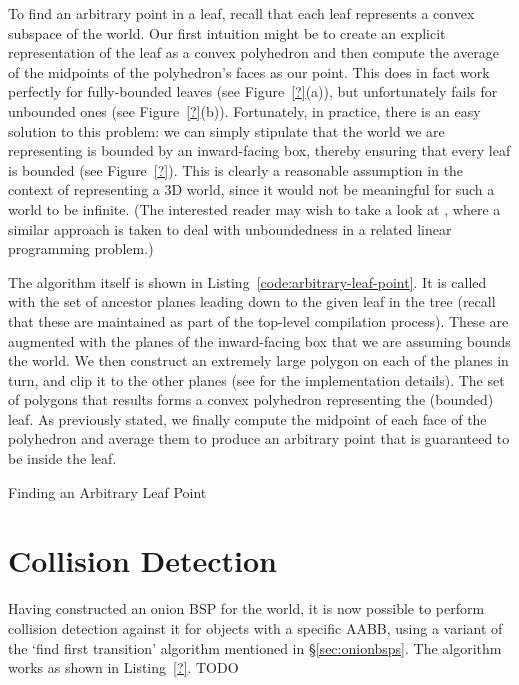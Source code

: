 \documentclass[10pt,twocolumn]{article}
\begin{document}
To find an arbitrary point in a leaf, recall that each leaf represents a convex subspace of the world. Our first intuition might be to create an explicit representation of the leaf as a convex polyhedron and then compute the average of the midpoints of the polyhedron's faces as our point. This does in fact work perfectly for fully-bounded leaves (see Figure~\ref{?}(a)), but unfortunately fails for unbounded ones (see Figure~\ref{?}(b)). Fortunately, in practice, there is an easy solution to this problem: we can simply stipulate that the world we are representing is bounded by an inward-facing box, thereby ensuring that every leaf is bounded (see Figure~\ref{?}). This is clearly a reasonable assumption in the context of representing a 3D world, since it would not be meaningful for such a world to be infinite. (The interested reader may wish to take a look at \cite{seidel91}, where a similar approach is taken to deal with unboundedness in a related linear programming problem.)

The algorithm itself is shown in Listing~\ref{code:arbitrary-leaf-point}. It is called with the set of ancestor planes leading down to the given leaf in the tree (recall that these are maintained as part of the top-level compilation process). These are augmented with the planes of the inward-facing box that we are assuming bounds the world. We then construct an extremely large polygon on each of the planes in turn, and clip it to the other planes (see \cite{hesperus} for the implementation details). The set of polygons that results forms a convex polyhedron representing the (bounded) leaf. As previously stated, we finally compute the midpoint of each face of the polyhedron and average them to produce an arbitrary point that is guaranteed to be inside the leaf.

\begin{stulisting}[!t]
\caption{Finding an Arbitrary Leaf Point}
\label{code:arbitrary-leaf-point}

\end{stulisting}

\section{Collision Detection}
\label{sec:collisiondetection}

Having constructed an onion BSP for the world, it is now possible to perform collision detection against it for objects with a specific AABB, using a variant of the `find first transition' algorithm mentioned in \S\ref{sec:onionbsps}. The algorithm works as shown in Listing~\ref{?}. TODO
\end{document}
